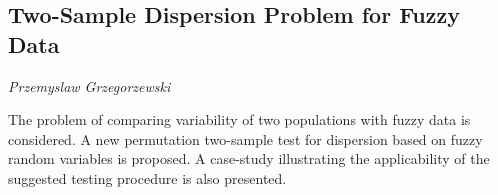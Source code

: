 \documentclass[../booklet.tex]{subfiles}
\begin{document}
\subsection[Two-Sample Dispersion Problem for Fuzzy Data. {\it Przemyslaw Grzegorzewski}]{Two-Sample Dispersion Problem for Fuzzy Data}

\begin{center}
  {\it Przemyslaw Grzegorzewski}
\end{center}

\vskip 0.8cm


The problem of comparing variability of two populations with fuzzy data is considered. A new permutation two-sample test for dispersion based on fuzzy random variables is proposed. A case-study illustrating the applicability of the suggested testing procedure is also presented.

\end{document}
